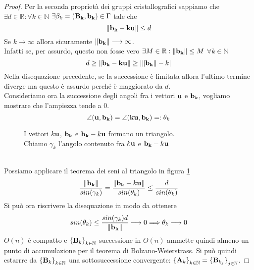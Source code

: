 \documentclass[a4paper,11pt,openright,twoside	]{book}
\begin{document}
\begin{proof}
Per la seconda proprietà dei gruppi cristallografici sappiamo che \\
$ \exists d \in \mathbb{R} : \forall k \in \mathbb{N} $ $  \exists \beta_k = \vb{( B_k, b_k)} \in \Gamma  $ tale che 
\[  \norm{\vb{b_k - ku }} \leq d \]
Se $k \longrightarrow \infty$ allora sicuramente $ \norm{\vb{b_k}} \longrightarrow \infty$.  \\
Infatti se, per assurdo, questo non fosse vero $\exists M \in \mathbb{R} : \norm{\vb{b_k}} \leq M $   $  \forall k \in \mathbb{N} $
\[ d \geq \norm{\vb{b_k - ku}} \geq | \norm{\vb{b_k}} - k | \]
Nella disequazione  precedente, se la successione è limitata allora l'ultimo termine diverge ma questo è assurdo perché è maggiorato da $d$. \\
Consideriamo ora la successione degli angoli fra i vettori $\vb{u}$ e $\vb{b}_k$, vogliamo mostrare che l'ampiezza tende a 0. 
\[ \angle (\vb{u , b_k}) = \angle (\vb{ku, b_k}) = : \theta_k \]
\begin{figure}[!h]
\centering
{}
\caption{I vettori $k \vb{u}$, $\vb{b_k}$ e $\vb{b_k}-k\vb{u}$ formano un triangolo. \\ Chiamo $\gamma_k$ l'angolo contenuto fra $k \vb{u}$ e $\vb{b_k}-k\vb{u}$}
\label{fig:trangolo1}
\end{figure} \\
Possiamo applicare il teorema dei seni al triangolo in figura \ref{fig:trangolo1}
\[ \frac{\norm{\vb{b_k}}}{sin(\gamma_k)} = \frac{\norm{\vb{b_k} - k\vb{u}}}{sin(\theta_k)}  \leq \frac{d}{sin(\theta_k)} \]
Si può ora riscrivere la disequazione in modo da ottenere
\[  sin(\theta_k) \leq \frac{sin(\gamma_k)d}{\norm{\vb{b_k}}} \longrightarrow 0 \Longrightarrow \theta_k \longrightarrow 0 \]
$O(n)$  è compatto e ${ \{\vb{B}_k \} }_{k \in \mathbb{N}}$ successione in  $O(n)$  ammette quindi almeno un punto di accumulazione per il teorema di Bolzano-Weierstrass. Si può quindi estarrre da ${ \{ \vb{B}_k \}}_{k \in \mathbb{N}}$  una sottosuccessione  convergente: $ { \{ \vb{A}_k \} }_{k \in \mathbb{N}} = { \{ \vb{B}_{k_j} \} }_{j \in \mathbb{N}}$. 

\end{proof}
\end{document}
